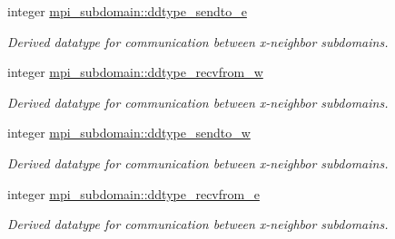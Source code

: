 \textbf{ }\par
\begin{DoxyCompactItemize}
\item 
integer \mbox{\hyperlink{namespacempi__subdomain_a93395266b1630e5a91e8e89531dfcec6}{mpi\+\_\+subdomain\+::ddtype\+\_\+sendto\+\_\+e}}
\begin{DoxyCompactList}\small\item\em Derived datatype for communication between x-\/neighbor subdomains. \end{DoxyCompactList}\item 
integer \mbox{\hyperlink{namespacempi__subdomain_a0b2a4ab6d6a88a3817f473a5c2c172b9}{mpi\+\_\+subdomain\+::ddtype\+\_\+recvfrom\+\_\+w}}
\begin{DoxyCompactList}\small\item\em Derived datatype for communication between x-\/neighbor subdomains. \end{DoxyCompactList}\item 
integer \mbox{\hyperlink{namespacempi__subdomain_a0701fde01daea1a6fd51b62c75b8ee82}{mpi\+\_\+subdomain\+::ddtype\+\_\+sendto\+\_\+w}}
\begin{DoxyCompactList}\small\item\em Derived datatype for communication between x-\/neighbor subdomains. \end{DoxyCompactList}\item 
integer \mbox{\hyperlink{namespacempi__subdomain_a18a84c0f3ca27cd4dd73057ff035f341}{mpi\+\_\+subdomain\+::ddtype\+\_\+recvfrom\+\_\+e}}
\begin{DoxyCompactList}\small\item\em Derived datatype for communication between x-\/neighbor subdomains. \end{DoxyCompactList}\end{DoxyCompactItemize}

